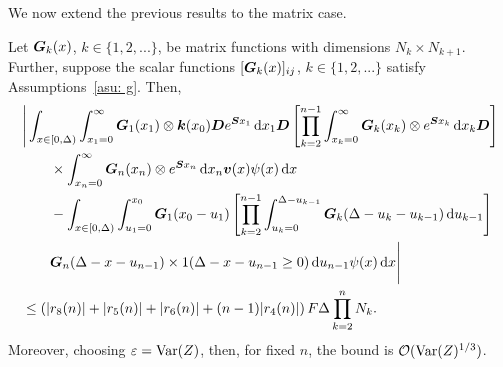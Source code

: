 %
%
We now extend the previous results to the matrix case.
\begin{lem}\label{lem: boobies2}
	Let \(\boldsymbol G_k(x)\), \(k\in\{1,2,...\}\), be matrix functions with dimensions \(N_k \times N_{k+1}\). Further, suppose the scalar functions \([\boldsymbol G_k(x)]_{ij}\), \(k\in\{1,2,...\}\) satisfy Assumptions~\ref{asu: g}. Then, 
	\begin{align}
		&\Bigg| \int_{x\in[0,\Delta)} \int_{x_1=0}^\infty \boldsymbol G_1(x_1) \otimes \boldsymbol k(x_0) \boldsymbol D e^{\boldsymbol{S}x_1}\, \mathrm{d} x_1\boldsymbol D 
				\left[\prod_{k=2}^{n-1}\int_{x_k=0}^\infty \boldsymbol G_{k}(x_k) \otimes e^{\boldsymbol{S}x_k} \, \mathrm{d} x_k
		\boldsymbol D\right] \nonumber 
				\\&\qquad{}\times\int_{x_n=0}^\infty \boldsymbol G_{n}(x_n) \otimes e^{\boldsymbol{S}x_n} \, \mathrm{d} x_n {\boldsymbol v}(x) \psi(x)\, \mathrm{d} x \nonumber 
		\\&\qquad {}- \int_{x\in[0,\Delta)} \int_{u_1=0}^{x_0}\boldsymbol G_1(x_0 - u_1)
		\left[\prod_{k=2}^{n-1} \int_{u_k=0}^{\Delta-u_{k-1}} \boldsymbol {G}_{k}(\Delta-u_k-u_{k-1})\, \mathrm{d} u_{k-1}\right] \nonumber 
				\\&\qquad{} \boldsymbol G_{n}(\Delta - x-u_{n-1})
	 		\times1(\Delta-x-u_{n-1}\geq0)\, \mathrm{d} u_{n-1}\psi(x)\, \mathrm{d} x \Bigg| \nonumber
		\\&\leq \left(|r_8(n)|+|r_5(n)|+|r_6(n)| + (n-1)|r_4(n)|\right)F\Delta \prod_{k=2}^{n}N_{k}.\label{eqn: KAFnnmna22G}
	\end{align}
	Moreover, choosing \(\varepsilon=\mathrm{Var}(Z)\), then, for fixed \(n\), the bound is \(\mathcal O(\mathrm{Var}(Z)^{1/3})\). 
\end{lem}
